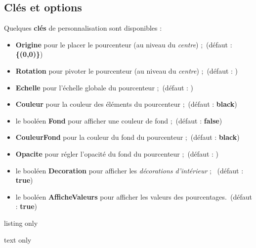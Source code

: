 \documentclass[french,a4paper,11pt]{article}
\newcommand\Cle[1]{{\bfseries\sffamily\textlangle #1\textrangle}}
\newcommand\affichegrille[4]{%
	\draw[xstep=1,ystep=1,lightgray] (#1,#3) grid (#2,#4) ;
	\foreach \x in {#1,\inteval{1+#1},...,#2} \draw[lightgray] (\x,#4)--++(0,3pt) node[font=\scriptsize,above] {$\x$} ;
	\foreach \y in {#3,\inteval{1+#3},...,#4} \draw[lightgray] (#1,\y)--++(-3pt,0) node[font=\scriptsize,left] {$\y$} ;
}
\newcommand\pointsutiles[1]{%
	\foreach \point in {#1} {\draw[thick,fill=red] \point circle[radius=3pt] ;}
}
\begin{document}
\subsection{Clés et options}

\begin{tipblock}
Quelques \Cle{clés} de personnalisation sont disponibles :

\begin{itemize}
	\item \Cle{Origine} pour le placer le pourcenteur (au niveau du \textit{centre}) ;\hfill~(défaut : \Cle{\{(0,0)\}})
	\item \Cle{Rotation} pour pivoter le pourcenteur (au niveau du \textit{centre}) ;\hfill~(défaut : \Cle{0})
	\item \Cle{Echelle} pour l'échelle globale du pourcenteur ;\hfill~(défaut : \Cle{1})
	\item \Cle{Couleur} pour la couleur des éléments du pourcenteur ;\hfill~(défaut : \Cle{black})
	\item le booléen \Cle{Fond} pour afficher une couleur de fond ;\hfill~(défaut : \Cle{false})
	\item \Cle{CouleurFond} pour la couleur du fond du pourcenteur ;\hfill~(défaut : \Cle{black})
	\item \Cle{Opacite} pour régler l'opacité du fond du pourcenteur ;\hfill~(défaut : \Cle{0.5})
	\item le booléen \Cle{Decoration} pour afficher les \textit{décorations d'intérieur} ; \hfill~(défaut : \Cle{true})
	\item le booléen \Cle{AfficheValeurs} pour afficher les valeurs des pourcentages.\hfill~(défaut : \Cle{true})
\end{itemize}
\vspace*{-\baselineskip}\leavevmode
\end{tipblock}

\pagebreak

\begin{PresentationCode}{listing only}
\tkzPourcenteur[Fond,CouleurFond=purple]
\tkzPourcenteur[Origine={(7,1)},Rotation=-45,Couleur=ForestGreen,Echelle=0.75]
\tkzPourcenteur[Decoration=false,AfficheValeurs=false,Origine={(9,-4)},Rotation=30, Couleur=DarkBlue,Fond,CouleurFond=DarkBlue,Echelle=0.66]
\tkzPourcenteur[Origine={(3,-4)},Rotation=90,Couleur=orange,Fond,CouleurFond=orange, Echelle=0.33]
\end{PresentationCode}

\begin{PresentationCode}{text only}
\end{PresentationCode}
\end{document}
